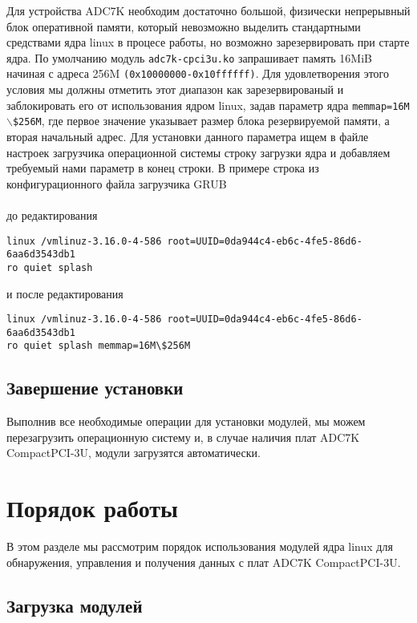 \documentclass[a4paper]{article}
\begin{document}
Для устройства ADC7K необходим достаточно большой, физически
непрерывный блок оперативной памяти, который невозможно выделить стандартными
средствами ядра linux в процесе работы, но возможно зарезервировать при старте ядра.
По умолчанию модуль \texttt{adc7k-cpci3u.ko} запрашивает память 16MiB начиная с
адреса 256M \texttt{(0x10000000-0x10ffffff)}. Для удовлетворения этого условия
мы должны отметить этот диапазон как зарезервированый и заблокировать его от использования
ядром linux, задав параметр ядра \texttt{memmap=16M$\backslash$\$256M}, где первое значение
указывает размер блока резервируемой памяти, а вторая начальный адрес.
Для установки данного параметра ищем в файле настроек загрузчика операционной системы
строку загрузки ядра и добавляем требуемый нами параметр в конец строки.
В примере строка из конфигурационного файла загрузчика GRUB
\\\\до редактирования
\begin{small}\begin{verbatim}
linux /vmlinuz-3.16.0-4-586 root=UUID=0da944c4-eb6c-4fe5-86d6-6aa6d3543db1
ro quiet splash
\end{verbatim}\end{small}
и после редактирования
\begin{small}\begin{verbatim}
linux /vmlinuz-3.16.0-4-586 root=UUID=0da944c4-eb6c-4fe5-86d6-6aa6d3543db1
ro quiet splash memmap=16M\$256M
\end{verbatim}\end{small}

\subsection{Завершение установки}

Выполнив все необходимые операции для установки модулей, мы можем перезагрузить
операционную систему и, в случае наличия плат ADC7K \mbox{CompactPCI-3U}, модули
загрузятся автоматически.

\section{Порядок работы}

В этом разделе мы рассмотрим порядок использования модулей ядра linux для обнаружения,
управления и получения данных с плат ADC7K \mbox{CompactPCI-3U}.

\subsection{Загрузка модулей}
\end{document}
